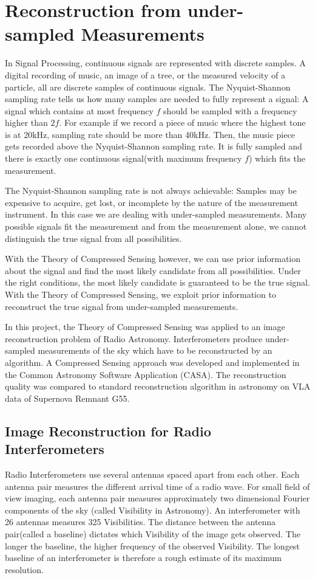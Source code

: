 \section{Reconstruction from under-sampled Measurements}\label{intro}
In Signal Processing, continuous signals are represented with discrete samples. A digital recording of music, an image of a tree, or the measured velocity of a particle, all are discrete samples of continuous signals. The Nyquist-Shannon sampling rate tells us how many samples are needed to fully represent a signal: A signal which contains at most frequency $f$ should be sampled with a frequency higher than $2f$. For example if we record a piece of music where the highest tone is at 20kHz, sampling rate should be more than 40kHz. Then, the music piece gets recorded above the Nyquist-Shannon sampling rate. It is fully sampled and there is exactly one continuous signal(with maximum frequency $f$) which fits the measurement.

The Nyquist-Shannon sampling rate is not always achievable: Samples may be expensive to acquire, get lost, or incomplete by the nature of the measurement instrument. In this case we are dealing with under-sampled measurements. Many possible signals fit the measurement and from the measurement alone, we cannot distinguish the true signal from all possibilities.

With the Theory of Compressed Sensing\cite{candes2006robust}\cite{donoho2006compressed} however, we can use prior information about the signal and find the most likely candidate from all possibilities. Under the right conditions, the most likely candidate is guaranteed to be the true signal. With the Theory of Compressed Sensing, we exploit prior information to reconstruct the true signal from under-sampled measurements.

In this project, the Theory of Compressed Sensing was applied to an image reconstruction problem of Radio Astronomy. Interferometers produce under-sampled measurements of the sky which have to be reconstructed by an algorithm. A Compressed Sensing approach was developed and implemented in the Common Astronomy Software Application (CASA). The reconstruction quality was compared to standard reconstruction algorithm in astronomy on VLA data of Supernova Remnant G55.


\subsection{Image Reconstruction for Radio Interferometers}
Radio Interferometers use several antennas spaced apart from each other. Each antenna pair measures the different arrival time of a radio wave. For small field of view imaging, each antenna pair measures approximately two dimensional Fourier components of the sky (called Visibility in Astronomy). An interferometer with 26 antennas measures 325 Visibilities. The distance between the antenna pair(called a baseline) dictates which Visibility of the image gets observed. The longer the baseline, the higher frequency of the observed Visibility. The longest baseline of an interferometer is therefore a rough estimate of its maximum resolution.

